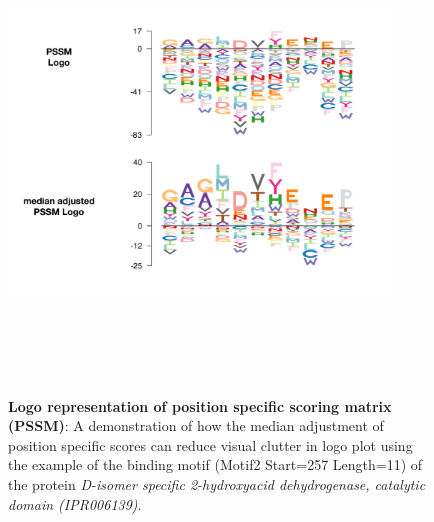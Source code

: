\documentclass{bmcart}
\begin{document}
\begin{figure}[h!]
\centering
\includegraphics[height=5in, width=4in]{suppfig/Figure6.pdf}
\caption{\textbf{Logo representation of position specific scoring matrix (PSSM)}: A demonstration of how the median adjustment of position specific scores can reduce visual clutter in logo plot using the example of the binding motif (Motif2 Start=257 Length=11) of the protein \textit{D-isomer specific 2-hydroxyacid dehydrogenase, catalytic domain (IPR006139)}.}
\label{fig:suppfig6}
\end{figure}

\newpage
\newpage
\newpage
\newpage
\end{document}

